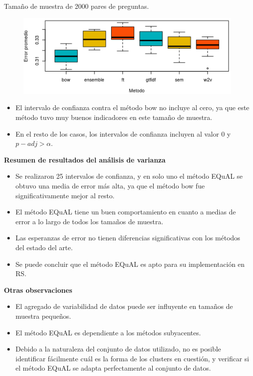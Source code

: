 \begin{frame}
	\framebreak

	Tamaño de muestra de 2000 pares de preguntas.
	\begin{figure}[!htbp]
		\centering
		\includegraphics[width=0.7\linewidth]{../10_resultados/imagenes/anova_2000}
		\label{fig:anova2000-1}
	\end{figure}

	\begin{itemize}[<*>]
		\item El intervalo de confianza contra el método bow no incluye al cero, ya que este método tuvo muy buenos indicadores en este tamaño de muestra.
		\item En el resto de los casos, los intervalos de confianza incluyen al valor 0 y \(p{-}adj > \alpha\).
	\end{itemize}

	\framebreak

	\normalsize
	\textbf{Resumen de resultados del análisis de varianza}
	\bigskip
	\begin{itemize}[<*>]
		\item Se realizaron 25 intervalos de confianza, y en solo uno el método EQuAL se obtuvo una media de error más alta, ya que el método bow fue significativamente mejor al resto.
		\item El método EQuAL tiene un buen comportamiento en cuanto a medias de error a lo largo de todos los tamaños de muestra.
		\item Las esperanzas de error no tienen diferencias significativas con los métodos del estado del arte.
		\item Se puede concluir que el método EQuAL es apto para su implementación en RS.
	\end{itemize}

	\framebreak

	\textbf{Otras observaciones}
	\bigskip
	\begin{itemize}[<*>]
		\item El agregado de variabilidad de datos puede ser influyente en tamaños de muestra pequeños.
		\item El método EQuAL es dependiente a los métodos subyacentes.
		\item Debido a la naturaleza del conjunto de datos utilizado, no es posible identificar fácilmente cuál es la forma de los clusters en cuestión, y verificar si el método EQuAL se adapta perfectamente al conjunto de datos.
	\end{itemize}

\end{frame}

